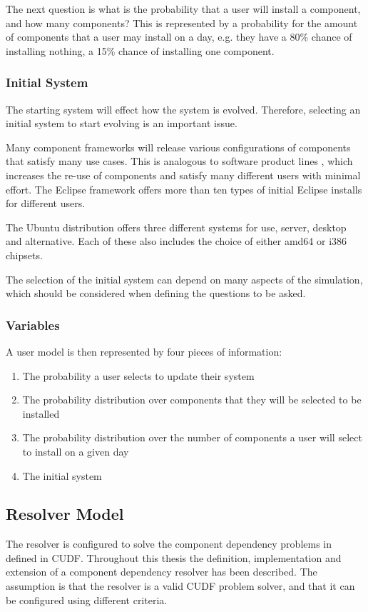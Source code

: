 The next question is what is the probability that a user will install a component, and how many components?
This is represented by a probability for the amount of components that a user may install on a day,
e.g. they have a 80\% chance of installing nothing, a 15\% chance of installing one component.

\subsubsection{Initial System}
The starting system will effect how the system is evolved.
Therefore, selecting an initial system to start evolving is an important issue.

Many component frameworks will release various configurations of components that satisfy many use cases.
This is analogous to software product lines \citep{clements2001software}, which increases the re-use of components and satisfy many different users with minimal effort.
The Eclipse framework offers more than ten types of initial Eclipse installs for different users.

The Ubuntu distribution offers three different systems for use, server, desktop and alternative.
Each of these also includes the choice of either amd64 or i386 chipsets.

The selection of the initial system can depend on many aspects of the simulation, which should be considered when defining the questions to be asked.

\subsubsection{Variables}
A user model is then represented by four pieces of information:
\begin{enumerate}
  \item The probability a user selects to update their system
  \item The probability distribution over components that they will be selected to be installed
  \item The probability distribution over the number of components a user will select to install on a given day
  \item The initial system
\end{enumerate}


\subsection{Resolver Model}
The resolver is configured to solve the component dependency problems in defined in CUDF.
Throughout this thesis the definition, implementation and extension of a component dependency resolver has been described.
The assumption is that the resolver is a valid CUDF problem solver, and that it can be configured using different criteria.

